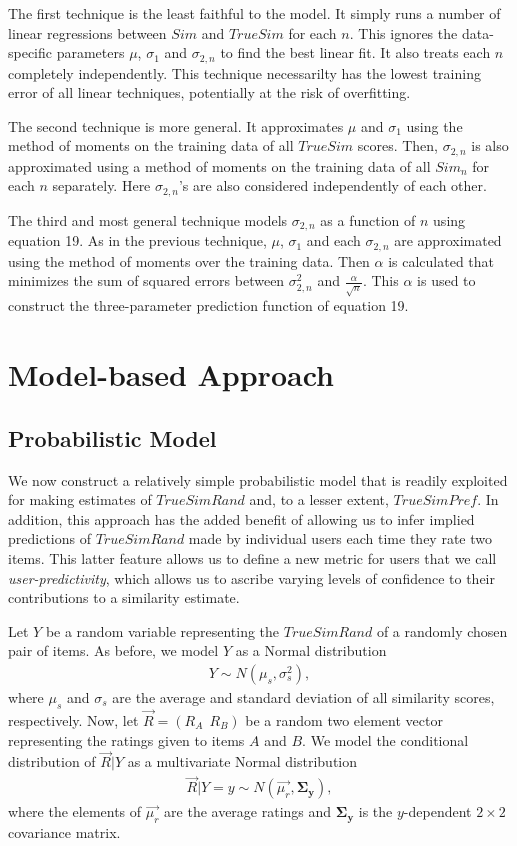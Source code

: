 \documentclass[11pt]{article}
\begin{document}
The first technique is the least faithful to the model. It simply runs a number
of linear regressions between $Sim$ and $TrueSim$ for each $n$. This ignores the 
data-specific parameters $\mu$, $\sigma_{1}$ and $\sigma_{2,n}$ to find the best 
linear fit. It also treats each $n$ completely independently. This technique 
necessarilty has the lowest training error of all linear techniques, potentially 
at the risk of overfitting.

The second technique is more general. It approximates $\mu$ and $\sigma_{1}$
using the method of moments on the training data of all $TrueSim$ scores. Then,
$\sigma_{2,n}$ is also approximated using a method of moments on the training
data of all $Sim_n$ for each $n$ separately. Here $\sigma_{2,n}$'s are also
considered independently of each other.

The third and most general technique models $\sigma_{2,n}$ as a function of
$n$ using equation 19. As in the previous technique, $\mu$, $\sigma_{1}$ and each
$\sigma_{2,n}$ are approximated using the method of moments over the training
data. Then $\alpha$ is calculated that minimizes the sum of squared errors
between $\sigma_{2,n}^2$ and $\frac{\alpha}{\sqrt{n}}$. This $\alpha$ is used to
construct the three-parameter prediction function of equation 19.

\section*{Model-based Approach}
\subsection*{Probabilistic Model}

We now construct a relatively simple probabilistic model that is readily
exploited for making estimates of $TrueSimRand$ and, to a lesser extent,
$TrueSimPref$. In addition, this approach has the added benefit of allowing us
to infer implied predictions of $TrueSimRand$ made by individual users each time
they rate two items. This latter feature allows us to define a new metric for
users that we call {\em user-predictivity}, which allows us to ascribe varying
levels of confidence to their contributions to a similarity estimate.

Let $Y$ be a random variable representing the $TrueSimRand$ of a randomly chosen
pair of items. As before, we model $Y$ as a Normal distribution
\begin{align}
Y \sim N(\mu_s, \sigma_s^2),
\end{align}
where $\mu_s$ and $\sigma_s$ are the average and standard deviation of all
similarity scores, respectively. Now, let $\vec{R} = \left(R_A~~R_B\right)$ be
a random two element vector representing the ratings given to items $A$ and $B$.
We model the conditional distribution of $\vec{R} | Y$ as a multivariate Normal
distribution
\begin{align}
\vec{R} | Y=y \sim N(\vec{\mu_r}, \mathbf{\Sigma_y}),
\end{align}
where the elements of $\vec{\mu_r}$ are the average ratings and
$\mathbf{\Sigma_y}$ is the $y$-dependent $2\times2$ covariance matrix.
\end{document}
